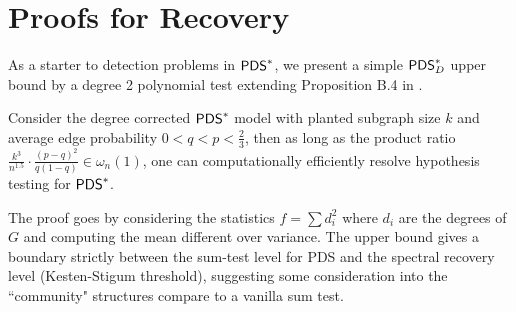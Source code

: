 \documentclass[final,12pt]{colt2023} %
\newcommand\1[1]{\mathbb{I}_{\left\{#1\right\}}}
\begin{document}
\section{Proofs for Recovery}\label{nots}
As a starter to detection problems in $\mathsf{PDS}^*$, we present a simple $\mathsf{PDS}^*_D$ upper bound by a degree 2 polynomial test extending Proposition B.4 in \cite{SchrammWein}.
\begin{proposition} \label{UpPDS}
Consider the degree corrected $\mathsf{PDS}^*$ model with planted subgraph size $k$ and average edge probability $0<q<p<\frac{2}{3}$, then as long as the product ratio $\frac{k^3}{n^{1.5}}\cdot\frac{(p-q)^2}{q(1-q)}\in\omega_n(1)$, one can computationally efficiently resolve hypothesis testing for $\mathsf{PDS}^*$.
\end{proposition} 
The proof goes by considering the statistics $f=\sum d_i^2$ where $d_i$ are the degrees of $G$ and computing the mean different over variance. The upper bound gives a boundary strictly between the sum-test level for PDS and the spectral recovery level (Kesten-Stigum threshold), suggesting some consideration into the ``community" structures compare to a vanilla sum test.
\end{document}

